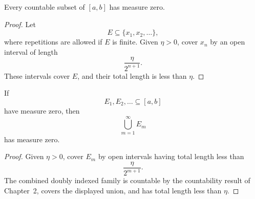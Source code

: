 \begin{proposition}
\label{prop:countable-negligible}
Every countable subset of $[a,b]$ has measure zero.
\end{proposition}
\begin{proof}
Let
\[
E\subseteq\{x_1,x_2,\ldots\},
\]
where repetitions are allowed if $E$ is finite.  Given $\eta>0$, cover
$x_n$ by an open interval of length
\[
\frac{\eta}{2^{n+1}}.
\]
These intervals cover $E$, and their total length is less than $\eta$.
\end{proof}

\begin{lemma}
\label{lem:countable-union-negligible}
If
\[
E_1,E_2,\ldots\subseteq[a,b]
\]
have measure zero, then
\[
\bigcup_{m=1}^{\infty}E_m
\]
has measure zero.
\end{lemma}
\begin{proof}
Given $\eta>0$, cover $E_m$ by open intervals having total length less
than
\[
\frac{\eta}{2^{m+1}}.
\]
The combined doubly indexed family is countable by the countability result
of Chapter~2, covers the displayed union, and has total length less than
$\eta$.
\end{proof}

